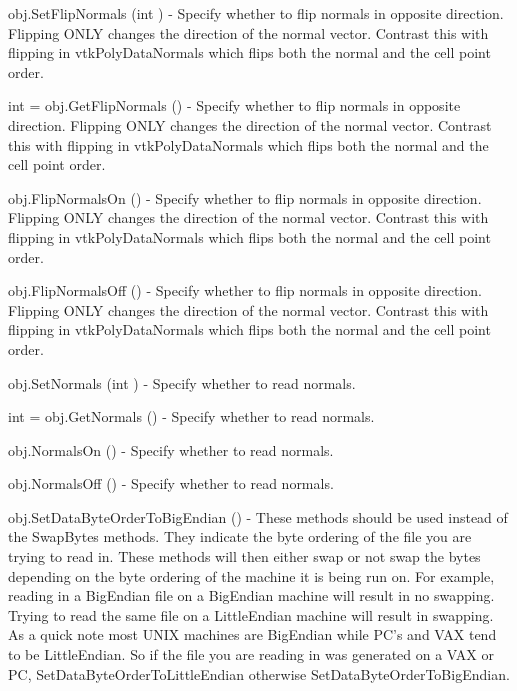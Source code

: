 \begin{DoxyItemize}
\item {\ttfamily obj.\-Set\-Flip\-Normals (int )} -\/ Specify whether to flip normals in opposite direction. Flipping O\-N\-L\-Y changes the direction of the normal vector. Contrast this with flipping in vtk\-Poly\-Data\-Normals which flips both the normal and the cell point order.  
\item {\ttfamily int = obj.\-Get\-Flip\-Normals ()} -\/ Specify whether to flip normals in opposite direction. Flipping O\-N\-L\-Y changes the direction of the normal vector. Contrast this with flipping in vtk\-Poly\-Data\-Normals which flips both the normal and the cell point order.  
\item {\ttfamily obj.\-Flip\-Normals\-On ()} -\/ Specify whether to flip normals in opposite direction. Flipping O\-N\-L\-Y changes the direction of the normal vector. Contrast this with flipping in vtk\-Poly\-Data\-Normals which flips both the normal and the cell point order.  
\item {\ttfamily obj.\-Flip\-Normals\-Off ()} -\/ Specify whether to flip normals in opposite direction. Flipping O\-N\-L\-Y changes the direction of the normal vector. Contrast this with flipping in vtk\-Poly\-Data\-Normals which flips both the normal and the cell point order.  
\item {\ttfamily obj.\-Set\-Normals (int )} -\/ Specify whether to read normals.  
\item {\ttfamily int = obj.\-Get\-Normals ()} -\/ Specify whether to read normals.  
\item {\ttfamily obj.\-Normals\-On ()} -\/ Specify whether to read normals.  
\item {\ttfamily obj.\-Normals\-Off ()} -\/ Specify whether to read normals.  
\item {\ttfamily obj.\-Set\-Data\-Byte\-Order\-To\-Big\-Endian ()} -\/ These methods should be used instead of the Swap\-Bytes methods. They indicate the byte ordering of the file you are trying to read in. These methods will then either swap or not swap the bytes depending on the byte ordering of the machine it is being run on. For example, reading in a Big\-Endian file on a Big\-Endian machine will result in no swapping. Trying to read the same file on a Little\-Endian machine will result in swapping. As a quick note most U\-N\-I\-X machines are Big\-Endian while P\-C's and V\-A\-X tend to be Little\-Endian. So if the file you are reading in was generated on a V\-A\-X or P\-C, Set\-Data\-Byte\-Order\-To\-Little\-Endian otherwise Set\-Data\-Byte\-Order\-To\-Big\-Endian.  

\end{DoxyItemize}
